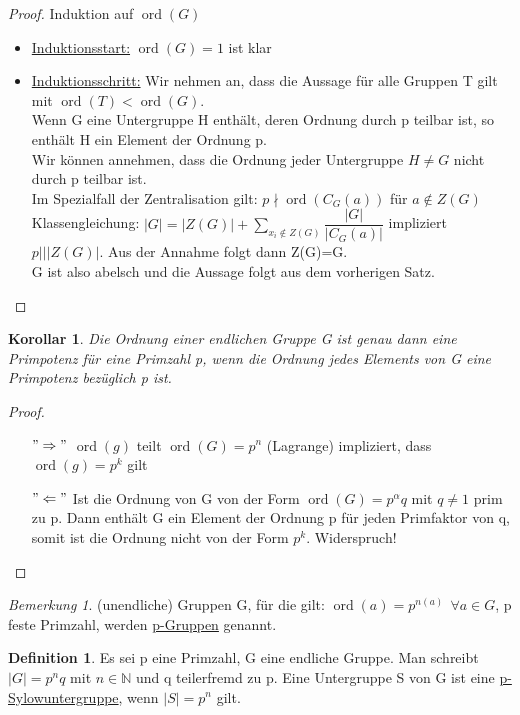 \documentclass[12pt]{scrartcl}%
\newtheorem{kor}{Korollar}
\theoremstyle{definition}
\newtheorem*{defn}{Definition}
\theoremstyle{remark}
\newtheorem*{nb}{Bemerkung}
\DeclareMathOperator\ord{ord}
\begin{document}
\begin{proof}
Induktion auf $\ord(G)$
\begin{itemize}
\item \underline{Induktionsstart:} $\ord(G)=1$ ist klar
\item \underline{Induktionsschritt:} Wir nehmen an, dass die Aussage für alle Gruppen T gilt mit $\ord(T)<\ord(G)$. \\
Wenn G eine Untergruppe H enthält, deren Ordnung durch p teilbar ist, so enthält H ein Element der Ordnung p. \\
Wir können annehmen, dass die Ordnung jeder Untergruppe $H\neq G$ nicht durch p teilbar ist. \\
Im Spezialfall der Zentralisation gilt: $p \nmid \ord(C_{G}(a))$ für $a \notin Z(G)$ \\
Klassengleichung: $|G|=|Z(G)|+\sum_{x_{i}\notin Z(G)}\dfrac{|G|}{|C_{G}(a)|}$ impliziert $p|\mid |Z(G)|$. Aus der Annahme folgt dann Z(G)=G. \\
G ist also abelsch und die Aussage folgt aus dem vorherigen Satz.
\end{itemize}
\end{proof}

\begin{kor}
Die Ordnung einer endlichen Gruppe G ist genau dann eine Primpotenz für eine Primzahl p, wenn die Ordnung jedes Elements von G eine Primpotenz bezüglich p ist.
\end{kor}

\begin{proof}
\begin{itemize}
\item[$"\Rightarrow"$]$\ord(g)$ teilt $\ord(G)=p^n$ (Lagrange) impliziert, dass $\ord(g)=p^k$ gilt
\item[$"\Leftarrow"$]Ist die Ordnung von G von der Form $\ord(G)=p^\alpha q$ mit $q\neq 1$ prim zu p. Dann enthält G ein Element der Ordnung p für jeden Primfaktor von q, somit ist die Ordnung nicht von der Form $p^k$. Widerspruch!
\end{itemize}
\end{proof}

\begin{nb}
(unendliche) Gruppen G, für die gilt: $\ord(a)=p^{n(a)}\ \ \forall a \in G$, p feste Primzahl, werden \underline{p-Gruppen} genannt.
\end{nb}

\begin{defn}
Es sei p eine Primzahl, G eine endliche Gruppe. Man schreibt $|G|=p^n q$ mit $n \in \mathbb{N}$ und q teilerfremd zu p. Eine Untergruppe S von G ist eine \underline{p-Sylowuntergruppe}, wenn $|S|=p^n$ gilt.
\end{defn}
\end{document}
